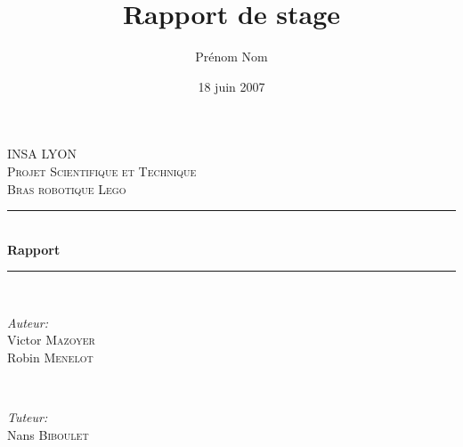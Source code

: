 \documentclass[a4paper, titlepage]{report}
\title{Rapport de stage}      %
\author{Prénom Nom}           %
\date{18 juin 2007}           %
\begin{document}
\begin{titlepage}

\newcommand{\HRule}{\rule{\linewidth}{0.5mm}} %

\center %
 

\textsc{\LARGE INSA LYON}\\[1.5cm] %
\textsc{\Large Projet Scientifique et Technique}\\[0.5cm] %
\textsc{\large Bras robotique Lego}\\[0.5cm] %


\HRule \\[0.4cm]
{ \huge \bfseries Rapport}\\[0.4cm] %
\HRule \\[1.5cm]
 

\begin{minipage}{0.4\textwidth}
\begin{flushleft} \large
\emph{Auteur:}\\ 
Victor \textsc{Mazoyer}\\ 
Robin \textsc{Menelot}
\end{flushleft}
\end{minipage}
~
\begin{minipage}{0.4\textwidth}
\begin{flushright} \large
\emph{Tuteur:} \\
Nans \textsc{Biboulet} 
\end{flushright}
\end{minipage}\\[4cm]



\end{titlepage}
\end{document}
